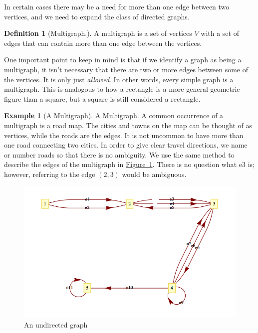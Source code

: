 \documentclass[10pt,]{book}
\theoremstyle{plain}
\theoremstyle{definition}
\newtheorem{definition}[theorem]{Definition}
\theoremstyle{definition}
\theoremstyle{definition}
\newtheorem{example}[theorem]{Example}
\theoremstyle{definition}
\theoremstyle{definition}
\numberwithin{equation}{section}
\begin{document}
\par
In certain cases there may be a need for more than one edge between two vertices, and we need to expand the class of directed graphs.%
\begin{definition}[Multigraph.]\label{def-multigraph}
 A multigraph is a set of vertices \(V\) with a set of edges that can contain more than one edge between the vertices.%
\end{definition}
\par
One important point to keep in mind is that if we identify a graph as being a multigraph, it isn't necessary that there are two or more edges between some of the vertices.  It is only just \emph{allowed}. In other words, every simple graph is a multigraph. This is analogous to how a rectangle is a more general geometric figure than a square, but a square is still considered a rectangle.%
\begin{example}[A Multigraph]\label{ex-multigraph-9-1}
 A Multigraph. A common occurrence of a multigraph is a road map. The cities and towns on the map can be thought of as vertices, while the roads are the edges. It is not uncommon to have more than one road connecting two cities. In order to give clear travel directions, we name or number roads so that there is no ambiguity. We use the same method to describe the edges of the multigraph in \hyperref[fig-multigraph-ex1]{Figure~\ref{fig-multigraph-ex1}}. There is no question
what \(\textrm{e3}\) is; however, referring to the edge \((2, 3)\) would be ambiguous.
%
\leavevmode%
\begin{figure}
\centering
\includegraphics[width=1\linewidth]{images/fig-multigraph-ex1.png}
\caption{An undirected graph\label{fig-multigraph-ex1}}
\end{figure}
\end{example}
\end{document}

